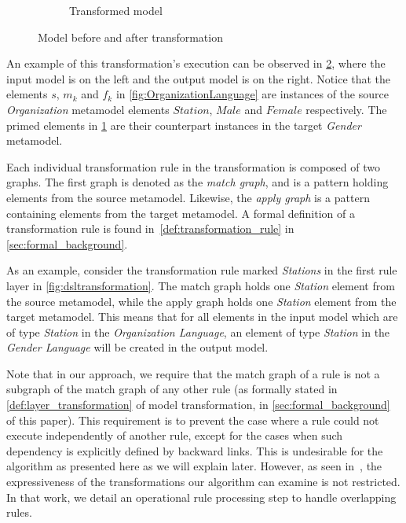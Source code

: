 \begin{figure}[htb]
\begin{subfigure}[b]{0.40\textwidth}
                \caption{Transformed model}
                \label{fig:police_gender}
        \end{subfigure}%
        \caption{Model before and after transformation}
        \label{fig:transformationexample}
\end{figure}

An example of this transformation's execution can be observed in \cref{fig:transformationexample}, where the input model is on the left and the output model is on the right. Notice that the elements $s$, $m_k$  and $f_k$ in \cref{fig:OrganizationLanguage} are instances of the source \emph{Organization} metamodel elements $Station$, $Male$ and $Female$ respectively. The primed elements in \cref{fig:police_gender} are their counterpart instances in the target \emph{Gender} metamodel.

Each individual transformation rule in the transformation is composed of two graphs. The first graph
is denoted as the \emph{match graph}, and is a pattern holding elements from the
source metamodel. Likewise, the \emph{apply graph} is a pattern containing
elements from the target metamodel. A formal definition of a transformation rule is found in~\cref{def:transformation_rule} in \cref{sec:formal_background}.

As an example, consider the transformation rule marked \emph{Stations} in the
first rule layer in \cref{fig:dsltransformation}. The match graph holds
one \emph{Station} element from the source metamodel, while the apply graph
holds one \emph{Station} element from the target metamodel. This means that for all
elements in the input model which are of type \emph{Station} in the
\emph{Organization Language}, an element of type
\emph{Station} in the \emph{Gender Language} will be created in the output model.

Note that in our approach, we require that the match graph of a rule is not a subgraph of the match graph of any other rule (as formally stated in \cref{def:layer_transformation} of model transformation, in \cref{sec:formal_background} of this paper). This requirement is to prevent the case where a rule could not execute independently of another rule, except for the cases when such dependency is explicitly defined by backward links. This is undesirable for the algorithm as presented here as we will explain later. However, as seen in~\cite{conf/gg/SelimLCDO14}, the expressiveness of the transformations our algorithm can examine   is not restricted. In that work, we detail an operational rule processing step to handle overlapping rules.

